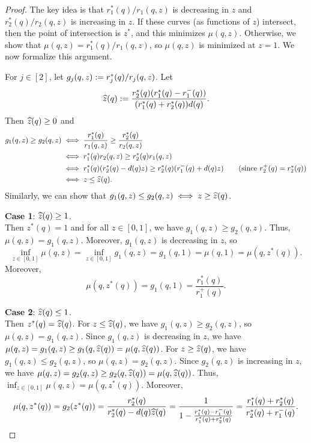 \begin{proof}
The key idea is that $r_1^*(q)/r_1(q, z)$ is decreasing in $z$
and $r_2^*(q)/r_2(q, z)$ is increasing in $z$.
If these curves (as functions of $z$) intersect,
then the point of intersection is $z^*$, and this minimizes $\mu(q, z)$.
Otherwise, we show that $\mu(q, z) = r_1^*(q)/r_1(q, z)$,
so $\mu(q, z)$ is minimized at $z = 1$.
We now formalize this argument.

For $j \in [2]$, let $g_j(q, z) := r_j^*(q)/r_j(q, z)$. Let
\[ \widehat{z}(q) := \frac{r_2^*(q)(r_1^*(q) - r_1^-(q))}{(r_1^*(q) + r_2^*(q))d(q)}. \]
Then $\widehat{z}(q) \ge 0$ and
\begin{align*}
g_1(q, z) \ge g_2(q, z)
    &\iff \frac{r_1^*(q)}{r_1(q, z)} \ge \frac{r_2^*(q)}{r_2(q, z)}
\\ &\iff r_1^*(q)r_2(q, z) \ge r_2^*(q)r_1(q, z)
\\ &\iff r_1^*(q)(r_2^*(q) - d(q)z) \ge r_2^*(q)(r_1^-(q) + d(q)z)
    \tag{since $r_2^+(q) = r_2^*(q)$}
\\ &\iff z \le \widehat{z}(q).
\end{align*}
Similarly, we can show that $g_1(q, z) \le g_2(q, z) \iff z \ge \widehat{z}(q)$.

\textbf{Case 1}: $\widehat{z}(q) \ge 1$.
\\ Then $z^*(q) = 1$ and for all $z \in [0, 1]$, we have $g_1(q, z) \ge g_2(q, z)$.
Thus, $\mu(q, z) = g_1(q, z)$. Moreover, $g_1(q, z)$ is decreasing in $z$, so
\[ \inf_{z \in [0, 1]} \mu(q, z) = \inf_{z \in [0, 1]} g_1(q, z) = g_1(q, 1) = \mu(q, 1) = \mu(q, z^*(q)). \]
Moreover,
\[ \mu(q, z^*(q)) = g_1(q, 1) = \frac{r_1^*(q)}{r_1^+(q)}. \]

\textbf{Case 2}: $\widehat{z}(q) \le 1$.
\\ Then $z^*(q) = \widehat{z}(q)$.
For $z \le \widehat{z}(q)$, we have $g_1(q, z) \ge g_2(q, z)$, so $\mu(q, z) = g_1(q, z)$.
Since $g_1(q, z)$ is decreasing in $z$, we have
$\mu(q, z) = g_1(q, z) \ge g_1(q, \widehat{z}(q)) = \mu(q, \widehat{z}(q))$.
For $z \ge \widehat{z}(q)$, we have $g_1(q, z) \le g_2(q, z)$, so $\mu(q, z) = g_2(q, z)$.
Since $g_2(q, z)$ is increasing in $z$, we have
$\mu(q, z) = g_2(q, z) \ge g_2(q, \widehat{z}(q)) = \mu(q, \widehat{z}(q))$.
Thus, $\inf_{z \in [0, 1]} \mu(q, z) = \mu(q, z^*(q))$.
Moreover,
\[ \mu(q, z^*(q)) = g_2(z^*(q)) = \frac{r_2^*(q)}{r_2^*(q) - d(q)\widehat{z}(q)}
    = \frac{1}{1 - \frac{r_1^*(q) - r_1^-(q)}{r_1^*(q)+r_2^*(q)}}
    = \frac{r_1^*(q) + r_2^*(q)}{r_2^*(q) + r_1^-(q)}. \]


\end{proof}
